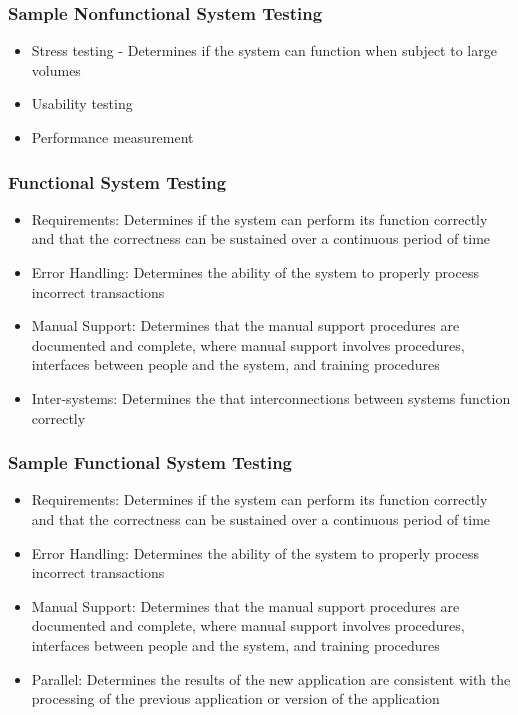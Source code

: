 \documentclass[t,12pt,numbers,fleqn]{beamer}
\begin{document}

\begin{frame}
\frametitle{Sample Nonfunctional System Testing}
\begin{itemize}
\item Stress testing - Determines if the system can function when subject to large volumes
\item Usability testing
\item Performance measurement
\end{itemize}
\end{frame}


\begin{frame}
\frametitle{Functional System Testing}
\begin{itemize}
\item Requirements: Determines if the system can perform its function correctly and that the correctness can be
sustained over a continuous period of time
\item Error Handling: Determines the ability of the system to properly process incorrect transactions
\item Manual Support: Determines that the manual support procedures are documented and complete, where manual support
involves procedures, interfaces between people and the system, and training procedures
\item Inter-systems: Determines the that interconnections between systems function correctly
\end{itemize}
\end{frame}


\begin{frame}
\frametitle{Sample Functional System Testing}
\begin{itemize}
\item Requirements: Determines if the system can perform its function correctly and that the correctness can be
sustained over a continuous period of time
\item Error Handling: Determines the ability of the system to properly process
  incorrect transactions
\item Manual Support: Determines that the manual support procedures are documented and complete, where manual support
involves procedures, interfaces between people and the system, and training procedures
\item Parallel: Determines the results of the new application are consistent with the processing of the previous
application or version of the application
\end{itemize}
\end{frame}
\end{document}
